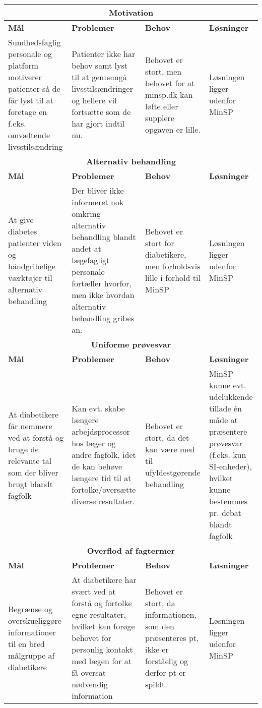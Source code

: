 \newpage

\begin{tabularx}{\textwidth}{|X|X|X|X|}
	\hline
	\multicolumn{4}{|c|}{\textbf{Motivation}}\\
	\hline
	\textbf{Mål} & \textbf{Problemer} & \textbf{Behov} & \textbf{Løsninger}\\
	\hline
	Sundhedsfaglig personale og platform motiverer patienter så de får lyst til at foretage en f.eks. omvæltende livsstilsændring&
	Patienter ikke har behov samt lyst til at gennemgå livsstilsændringer og hellere vil fortsætte som de har gjort indtil nu.&
	Behovet er stort, men behovet for at minsp.dk kan løfte eller supplere opgaven er lille.&
	Løsningen ligger udenfor MinSP\\
	\hline
	\multicolumn{4}{|c|}{\textbf{Alternativ behandling}}\\
	\hline
	\textbf{Mål} & \textbf{Problemer} & \textbf{Behov} & \textbf{Løsninger}\\
	\hline
	At give diabetes patienter viden og håndgribelige værktøjer til alternativ behandling&
	Der bliver ikke informeret nok omkring alternativ behandling blandt andet at lægefagligt personale fortæller hvorfor, men ikke hvordan alternativ behandling gribes an.&
	Behovet er stort for diabetikere, men forholdsvis lille i forhold til MinSP&
	Løsningen ligger udenfor MinSP\\
	\hline
	\multicolumn{4}{|c|}{\textbf{Uniforme prøvesvar}}\\
	\hline
	\textbf{Mål} & \textbf{Problemer} & \textbf{Behov} & \textbf{Løsninger}\\
	\hline
	At diabetikere får nemmere ved at forstå og bruge de relevante tal som der bliver brugt blandt fagfolk&
	Kan evt. skabe længere arbejdsprocessor hos læger og andre fagfolk, idet de kan behøve længere tid til at fortolke/oversætte diverse resultater.&
	Behovet er stort, da det kan være med til ufyldestgørende behandling&
	MinSP kunne evt. udelukkende tillade én måde at præsentere prøvesvar (f.eks. kun SI-enheder), hvilket kunne bestemmes pr. debat blandt fagfolk\\
	\hline
	\multicolumn{4}{|c|}{\textbf{Overflod af fagtermer}}\\
	\hline
	\textbf{Mål} & \textbf{Problemer} & \textbf{Behov} & \textbf{Løsninger}\\
	\hline
	Begrænse og overskueliggøre informationer til en bred målgruppe af diabetikere&
	At diabetikere har svært ved at forstå og fortolke egne resultater, hvilket kan forøge behovet for personlig kontakt med lægen for at få oversat nødvendig information&
	Behovet er stort, da informationen, som den præsenteres pt, ikke er forståelig og derfor pt er spildt.&
	Løsningen ligger udenfor MinSP\\
	\hline
\end{tabularx}

